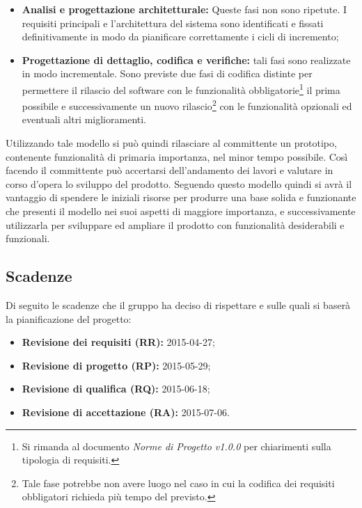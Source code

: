\begin{itemize}
	\item \textbf{Analisi e progettazione architetturale:} Queste fasi non sono ripetute. I requisiti principali e l'architettura del sistema sono identificati e fissati definitivamente in modo da pianificare correttamente i cicli di incremento; 
	\item \textbf{Progettazione di dettaglio, codifica e verifiche:} tali fasi sono realizzate in modo incrementale. Sono previste due fasi di codifica distinte per permettere il rilascio del software con le funzionalità obbligatorie\footnote{Si rimanda al documento \textit{Norme di Progetto v1.0.0} per chiarimenti sulla tipologia di requisiti.} il prima possibile e successivamente un nuovo rilascio\footnote{Tale fase potrebbe non avere luogo nel caso in cui la codifica dei requisiti obbligatori richieda più tempo del previsto.} con le funzionalità opzionali ed eventuali altri miglioramenti.
\end{itemize}
Utilizzando tale modello si può quindi rilasciare al committente un prototipo, contenente funzionalità di primaria importanza, nel minor tempo possibile. Così facendo il committente può accertarsi dell'andamento dei lavori e valutare in corso d'opera lo sviluppo del prodotto. Seguendo questo modello quindi si avrà il vantaggio di spendere le iniziali risorse per produrre una base solida e funzionante che presenti il modello nei suoi aspetti di maggiore importanza, e successivamente utilizzarla per sviluppare ed ampliare il prodotto con funzionalità desiderabili e funzionali.
 
\subsection{Scadenze}
Di seguito le scadenze che il gruppo \GRUPPO{} ha deciso di rispettare e sulle quali si baserà la pianificazione del progetto:
\begin{itemize}
	\item \textbf{Revisione dei requisiti (RR):} 2015-04-27;
	\item \textbf{Revisione di progetto (RP):} 2015-05-29;
	\item \textbf{Revisione di qualifica (RQ):} 2015-06-18;
	\item \textbf{Revisione di accettazione (RA):} 2015-07-06.
\end{itemize}





